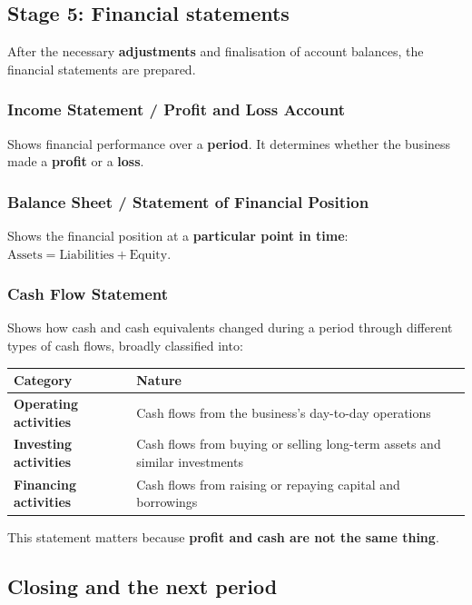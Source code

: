 \documentclass[11pt,a4paper]{article}
\begin{document}
\subsection{Stage 5: Financial statements}

After the necessary \textbf{adjustments} and finalisation of account balances, the financial
statements are prepared.

\subsubsection{Income Statement / Profit and Loss Account}
Shows financial performance over a \textbf{period}. It determines whether the business made a
\textbf{profit} or a \textbf{loss}.

\subsubsection{Balance Sheet / Statement of Financial Position}
Shows the financial position at a \textbf{particular point in time}:
$\text{Assets}=\text{Liabilities}+\text{Equity}$.

\subsubsection{Cash Flow Statement}
Shows how cash and cash equivalents changed during a period through different types of cash
flows, broadly classified into:

\begin{center}
\small
\begin{tabularx}{\textwidth}{@{}l Y@{}}
\toprule
{}\textbf{Category} & \textbf{Nature}\\
\midrule
\textbf{Operating activities} & Cash flows from the business's day-to-day operations\\
\textbf{Investing activities} & Cash flows from buying or selling long-term assets and similar investments\\
\textbf{Financing activities} & Cash flows from raising or repaying capital and borrowings\\
\bottomrule
\end{tabularx}
\end{center}

This statement matters because \textbf{profit and cash are not the same thing}.

\subsection{Closing and the next period}
\end{document}
